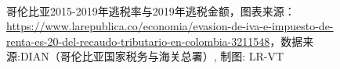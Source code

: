 \documentclass{phyasgn}\usepackage{nag}
\begin{document}
\begin{figure}[!h]
	\centering
	\vspace{-0.3\baselineskip}
	\quad
	\\
	\caption{哥伦比亚2015-2019年逃税率与2019年逃税金额，图表来源：\footnotesize{\url{https://www.larepublica.co/economia/evasion-de-iva-e-impuesto-de-renta-es-20-del-recaudo-tributario-en-colombia-3211548}}，数据来源:DIAN（哥伦比亚国家税务与海关总署）, 制图: LR-VT
}
	\end{figure}
\end{document}
